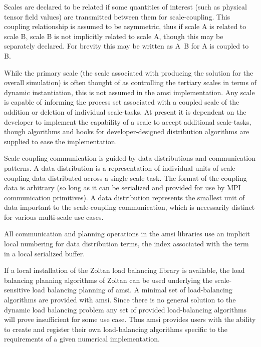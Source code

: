\documentclass[11pt]{siamltex1213}
\begin{document}
Scales are declared to be related if some quantities of interest (such as physical tensor field values) are transmitted between them for scale-coupling. This coupling relationship is assumed to be asymmetric, thus if scale A is related to scale B, scale B is not implicitly related to scale A, though this may be separately declared. For brevity this may be written as A~B for A is coupled to B.

While the primary scale (the scale associated with producing the solution for the overall simulation) is often thought of as controlling the tertiary scales in terms of dynamic instantiation, this is not assumed in the amsi implementation. Any scale is capable of informing the process set associated with a coupled scale of the addition or deletion of individual scale-tasks. At present it is dependent on the developer to implement the capability of a scale to accept additional scale-tasks, though algorithms and hooks for developer-designed distribution algorithms are supplied to ease the implementation.

\label{amsi_communication}
Scale coupling communication is guided by data distributions and communication patterns. A data distribution is a representation of individual units of scale-coupling data distributed across a single scale-task. The format of the coupling data is arbitrary (so long as it can be serialized and provided for use by MPI communication primitives). A data distribution represents the smallest unit of data important to the scale-coupling communication, which is necessarily distinct for various multi-scale use cases. 

All communication and planning operations in the amsi libraries use an implicit local numbering for data distribution terms, the index associated with the term in a local serialized buffer.

\label{amsi_load_balancing}
If a local installation of the Zoltan \cite{ZoltanOverviewArticle2002} \cite{ZoltanIsorropiaOverview2012} load balancing library is available, the load balancing planning algorithms of Zoltan can be used underlying the scale-sensitive load balancing planning of amsi. A minimal set of load-balancing algorithms are provided with amsi. Since there is no general solution to the dynamic load balancing problem any set of provided load-balancing algorithms will prove insufficient for some use case. Thus amsi provides users with the ability to create and register their own load-balancing algorithms specific to the requirements of a given numerical implementation.
\end{document}
